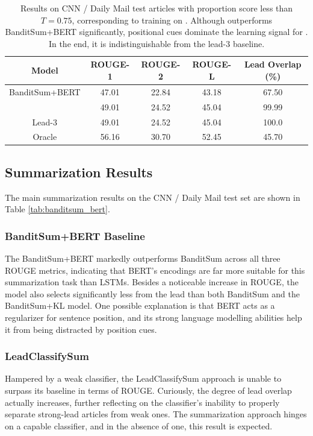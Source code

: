 \begin{table}[t]
    \centering
    \begin{tabular}{c|c|c|c|c}
    \toprule
    Model &	ROUGE-1	&	ROUGE-2	&	ROUGE-L	&	Lead Overlap (\%)	\\ \hline
    BanditSum+BERT	&	47.01	&	22.84	&	43.18	&	67.50	\\
    \BanSumEarly	&	49.01	&	24.52	&	45.04	&	99.99	\\ \hline
    Lead-3	&	49.01	&	24.52	&	45.04	&	100.0	\\
    Oracle	&	56.16	&	30.70	&	52.45	&	45.70	\\ \bottomrule
    \end{tabular}
    \caption[ROUGE results on \Dearly{}.]{Results on CNN / Daily Mail test articles with proportion score less than $T = 0.75$, corresponding to training on \Dearly. Although \BanSumEarly{} outperforms BanditSum+BERT significantly, positional cues dominate the learning signal for \BanSumEarly{}. In the end, it is indistinguishable from the lead-3 baseline.}
    \label{tab:early_subset}
\end{table}

\subsection{Summarization Results}
The main summarization results on the CNN / Daily Mail test set are shown in Table \ref{tab:banditsum_bert}. 

\subsubsection{BanditSum+BERT Baseline}
The BanditSum+BERT markedly outperforms BanditSum across all three ROUGE metrics, indicating that BERT's encodings are far more suitable for this summarization task than LSTMs. Besides a noticeable increase in ROUGE, the model also selects significantly less from the lead than both BanditSum and the BanditSum+KL model. One possible explanation is that BERT acts as a regularizer for sentence position, and its strong language modelling abilities help it from being distracted by position cues.

\subsubsection{LeadClassifySum}
Hampered by a weak classifier, the LeadClassifySum approach is unable to surpass its baseline in terms of ROUGE. Curiously, the degree of lead overlap actually increases, further reflecting on the classifier's inability to properly separate strong-lead articles from weak ones. The summarization approach hinges on a capable classifier, and in the absence of one, this result is expected.

